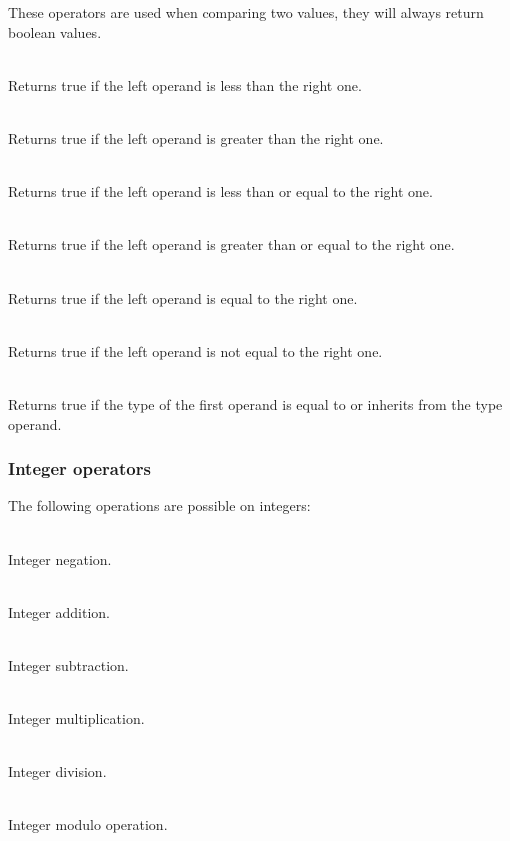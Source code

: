 These operators are used when comparing two values, they will always return
boolean values.
\begin{dlist}
  \item {}\\
    Returns true if the left operand is less than the right one.
  \item {}\\
    Returns true if the left operand is greater than the right one.
  \item {}\\
    Returns true if the left operand is less than or equal to the right one.
  \item {}\\
    Returns true if the left operand is greater than or equal to the right one.
  \item {}\\
    Returns true if the left operand is equal to the right one.
  \item {}\\
    Returns true if the left operand is not equal to the right one.
  \item {}\\
    Returns true if the type of the first operand is equal to or inherits from
    the type operand.
\end{dlist}

\subsubsection{Integer operators}

The following operations are possible on integers:
\begin{dlist}
  \item {} \\
    Integer negation.
  \item {} \\
    Integer addition.
  \item {} \\
    Integer subtraction.
  \item {} \\
    Integer multiplication.
  \item {} \\
    Integer division.
  \item {} \\
    Integer modulo operation.
\end{dlist}


